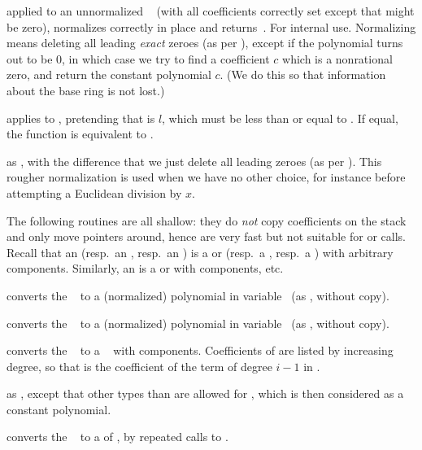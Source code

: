  applied to an unnormalized ~
(with all coefficients correctly set except that  might
be zero), normalizes  correctly in place and returns~. For
internal use. Normalizing means deleting all leading \emph{exact} zeroes
(as per ), except if the polynomial turns out to be $0$,
in which case we try to find a coefficient $c$ which is a nonrational zero,
and return the constant polynomial $c$. (We do this so that information
about the base ring is not lost.)

 applies  to
, pretending that  is $l$, which must be less than
or equal to . If equal, the function is equivalent to
.

 as ,
with the difference that we just delete all leading zeroes (as per
). This rougher normalization is used when we have no other
choice, for instance before attempting a Euclidean division by $x$.

The following routines are all shallow: they do \emph{not} copy coefficients
on the stack and only move pointers around, hence are very fast but not
suitable for  or  calls. Recall that an
 (resp.~an , resp.~an
) is a  or  (resp.~a , resp.~a )
with arbitrary components. Similarly, an  is a  or
 with  components, etc.

 converts the ~ to a
(normalized) polynomial in variable~ (as , without
copy).

 converts the ~
to a (normalized) polynomial in variable~ (as ,
without copy).

 converts the ~ to a
~ with  components. Coefficients of  are listed
by increasing degree, so that  is the coefficient of the term of
degree $i-1$ in .

 as , except that other
types than  are allowed for , which is then considered as a
constant polynomial.

 converts the ~ to a
 of , by repeated calls to .

